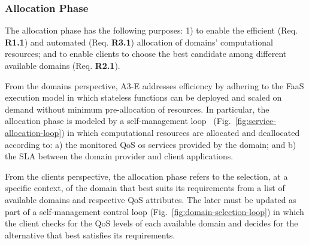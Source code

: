 \subsubsection*{Allocation Phase}\label{sec:A3-E-allocation}

The allocation phase has the following purposes: 1) to enable the efficient (Req. \textbf{R1.1}) and automated (Req. \textbf{R3.1}) allocation of domains' computational resources; and to enable clients to choose the best candidate among different available domains (Req. \textbf{R2.1}).


From the domains perspective, A3-E addresses efficiency by adhering to the FaaS execution model in which stateless functions can be deployed and scaled on demand without minimum pre-allocation of resources. In particular, the allocation phase is modeled by a self-management loop~\cite{kephart2003vision} (Fig.~\ref{fig:service-allocation-loop}) in which computational resources are allocated and deallocated according to: a) the monitored QoS os services provided by the domain; and b) the SLA between the domain provider and client applications. 



From the clients perspective, the allocation phase refers to the selection, at a specific context, of the domain that best suits its requirements from a list of available domains and respective QoS attributes. The later must be updated as part of a self-management control loop (Fig.~\ref{fig:domain-selection-loop}) in which the client checks for the QoS levels of each available domain and decides for the alternative that best satisfies its requirements. 




